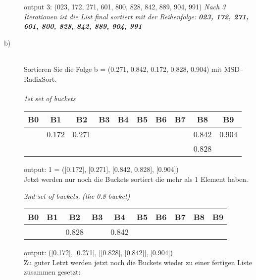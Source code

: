 \documentclass[12pt, a4paper, oneside]{article}
\begin{document}
\begin{description}
\begin{tabular}{| c| c| c| c| c| c| c| c| c| c|}
		\hline
	\end{tabular}
	
	output 3: (023, 172, 271, 601, 800, 828, 842, 889, 904, 991)
	\newline
	\emph{Nach 3 Iterationen ist die List final sortiert mit der Reihenfolge:}
	\newline
	\textbf{\emph{023, 172, 271, 601, 800, 828, 842, 889, 904, 991}}
	
	\newpage
	\item[b)] \hfill \\
	Sortieren Sie die Folge b = (0.271, 0.842, 0.172, 0.828, 0.904) mit MSD–RadixSort.
	\\ \\
	
	\emph{1st set of buckets}\\
	\begin{tabular}{| c| c| c| c| c| c| c| c| c| c|}
		
		\hline
		B0 & B1 & B2 & B3 & B4 & B5 & B6 & B7 & B8 & B9 \\
		\hline\hline
		
		& 0.172 & 0.271 & & & & & & 0.842 & 0.904 \\
		&       &       & & & & & & 0.828 &  \\
		
		\hline
	\end{tabular}

	output: 1 = ([0.172], [0.271], [0.842, 0.828], [0.904]) \\
	
	Jetzt werden nur noch die Buckets sortiert die mehr als 1 Element haben.
	
	\emph{2nd set of buckets, }
	\emph{(the 0.8 bucket)}\\
	\begin{tabular}{| c| c| c| c| c| c| c| c| c| c|}
		
		\hline
		B0 & B1 & B2 & B3 & B4 & B5 & B6 & B7 & B8 & B9 \\
		\hline\hline
		
		& & 0.828 & & 0.842 & & & & & \\
		
		\hline
	\end{tabular}
	
	output: ([0.172], [0.271], [[0.828], [0.842]], [0.904]) \\
	
	Zu guter Letzt werden jetzt noch die Buckets wieder zu einer fertigen Liste zusammen gesetzt:
	

\end{description}
\end{document}
